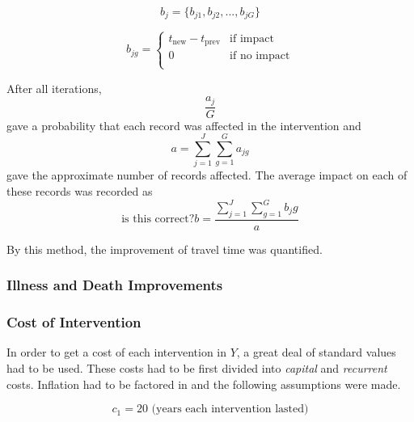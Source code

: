 \begin{equation*}
b_j = \{b_{j1},b_{j2},...,b_{jG}\}
\end{equation*}

\begin{equation*}
b_{jg} =
\left\{
\begin{array}{ll}
      t_{\text{new}} - t_{\text{prev}} & \text{if impact} \\
      0 & \text{if no impact}\\
\end{array}
\right.
\end{equation*}

After all iterations, 
\begin{equation*}
\frac{a_j}{G}
\end{equation*}
gave a probability that each record was affected in the intervention and
\begin{equation*}
a = \sum_{j=1}^{J} \sum_{g=1}^{G} a_{jg}
\end{equation*}
gave the approximate number of records affected.
The average impact on each of these records was recorded as
\begin{equation*}
\text{is this correct?}
b = \frac{\sum_{j=1}^{J} \sum_{g=1}^{G} b_jg}{a}
\end{equation*}

By this method, the improvement of travel time was quantified.

\subsubsection*{Illness and Death Improvements}


\subsubsection*{Cost of Intervention}
In order to get a cost of each intervention in $Y$, a great deal of standard values had to be used.
These costs had to be first divided into \emph{capital} and \emph{recurrent} costs.
Inflation had to be factored in and the following assumptions were made.

$$c_1 = 20 \text{ (years each intervention lasted)}$$









